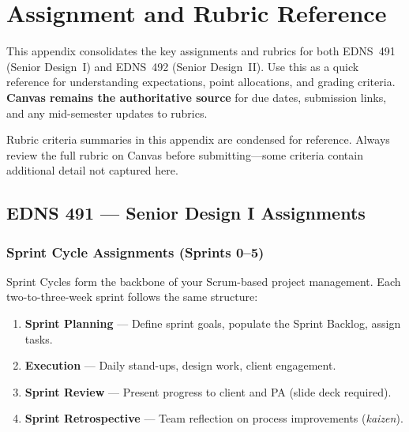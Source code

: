 
\newpage
\appendix
\section{Assignment and Rubric Reference}
\label{sec:assignments-rubrics}

This appendix consolidates the key assignments and rubrics for both EDNS~491 (Senior Design~I) and EDNS~492 (Senior Design~II). Use this as a quick reference for understanding expectations, point allocations, and grading criteria. \textbf{Canvas remains the authoritative source} for due dates, submission links, and any mid-semester updates to rubrics.

\begin{warnbox}
Rubric criteria summaries in this appendix are condensed for reference. Always review the full rubric on Canvas before submitting---some criteria contain additional detail not captured here.
\end{warnbox}

\subsection{EDNS 491 --- Senior Design I Assignments}
\label{subsec:sdi-assignments}

\subsubsection{Sprint Cycle Assignments (Sprints 0--5)}
\label{sssec:sprint-cycles-sdi}

Sprint Cycles form the backbone of your Scrum-based project management. Each two-to-three-week sprint follows the same structure:

\begin{enumerate}[leftmargin=*]
  \item \textbf{Sprint Planning} --- Define sprint goals, populate the Sprint Backlog, assign tasks.
  \item \textbf{Execution} --- Daily stand-ups, design work, client engagement.
  \item \textbf{Sprint Review} --- Present progress to client and PA (slide deck required).
  \item \textbf{Sprint Retrospective} --- Team reflection on process improvements (\emph{kaizen}).
\end{enumerate}

